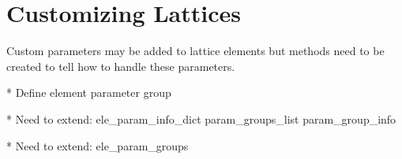 \chapter{Customizing Lattices}
\label{c:custom-lat}



Custom parameters may be added to lattice elements but methods need to be created to tell \accellat
how to handle these parameters.

* Define element parameter group

* Need to extend:
  ele_param_info_dict
  param_groups_list
  param_group_info



* Need to extend:
  ele_param_groups

